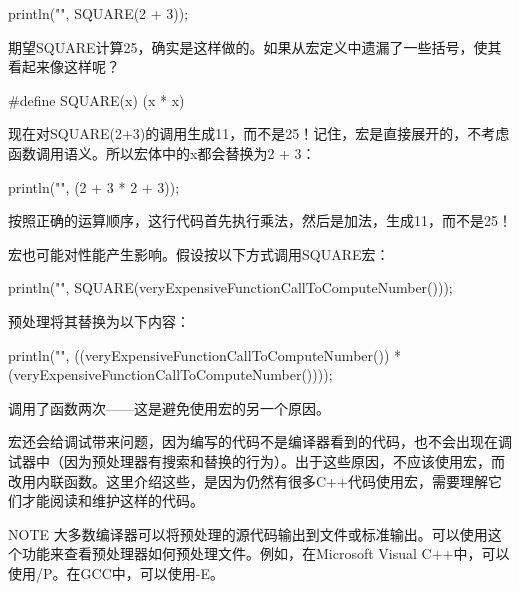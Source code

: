 \begin{cpp}
println("{}", SQUARE(2 + 3));
\end{cpp}

期望SQUARE计算25，确实是这样做的。如果从宏定义中遗漏了一些括号，使其看起来像这样呢？

\begin{cpp}
#define SQUARE(x) (x * x)
\end{cpp}

现在对SQUARE(2+3)的调用生成11，而不是25！记住，宏是直接展开的，不考虑函数调用语义。所以宏体中的x都会替换为2 + 3：

\begin{cpp}
println("{}", (2 + 3 * 2 + 3));
\end{cpp}

按照正确的运算顺序，这行代码首先执行乘法，然后是加法，生成11，而不是25！

宏也可能对性能产生影响。假设按以下方式调用SQUARE宏：

\begin{cpp}
println("{}", SQUARE(veryExpensiveFunctionCallToComputeNumber()));
\end{cpp}

预处理将其替换为以下内容：

\begin{cpp}
println("{}", ((veryExpensiveFunctionCallToComputeNumber()) *
        (veryExpensiveFunctionCallToComputeNumber())));
\end{cpp}

调用了函数两次——这是避免使用宏的另一个原因。

宏还会给调试带来问题，因为编写的代码不是编译器看到的代码，也不会出现在调试器中（因为预处理器有搜索和替换的行为）。出于这些原因，不应该使用宏，而改用内联函数。这里介绍这些，是因为仍然有很多C++代码使用宏，需要理解它们才能阅读和维护这样的代码。

\begin{myNotic}{NOTE}
大多数编译器可以将预处理的源代码输出到文件或标准输出。可以使用这个功能来查看预处理器如何预处理文件。例如，在Microsoft Visual C++中，可以使用/P。在GCC中，可以使用-E。
\end{myNotic}





